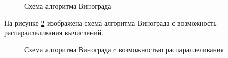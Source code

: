 \documentclass[a4paper,12pt]{article}
\begin{document}
\begin{figure}[H]
    \caption{Схема алгоритма Винограда}
    \label{img:modvinograd}
\end{figure}

На рисунке \ref{img:modvinograd-thread} изображена схема
алгоритма Винограда с возможность распараллеливания вычислений.

\begin{figure}[H]
    \caption{Схема алгоритма Винограда c возможностью распараллеливания}
    \label{img:modvinograd-thread}
\end{figure}
\end{document}
